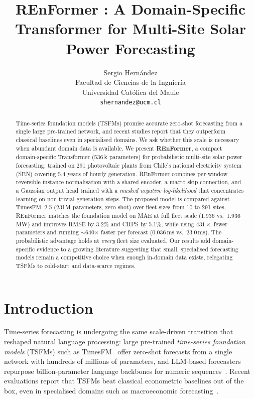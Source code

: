\documentclass[10pt,twocolumn]{article}
\title{\textbf{REnFormer} : A Domain-Specific
Transformer for Multi-Site Solar Power Forecasting}
\author{
  Sergio Hernández\\
  Facultad de Ciencias de la Ingniería\\
  Universidad Católica del Maule\\
  \texttt{shernandez@ucm.cl}
}
\date{}
\begin{document}
\maketitle

\begin{abstract}
Time-series foundation models (TSFMs) promise accurate
zero-shot forecasting from a single large pre-trained network, and recent
studies report that they outperform classical baselines even in
specialised domains. We ask whether this scale is necessary when abundant
domain data is available. We present \textbf{REnFormer}, a compact
domain-specific Transformer (536\,k parameters) for probabilistic
multi-site solar power forecasting, trained on 291 photovoltaic plants
from Chile's national electricity system (SEN) covering 5.4 years of
hourly generation. REnFormer combines per-window reversible instance
normalisation with a shared encoder, a macro skip connection, and a Gaussian output head trained with
a \emph{masked negative log-likelihood} that concentrates learning on
non-trivial generation steps. The proposed model is compared against
TimesFM~2.5 (231M parameters, zero-shot) over fleet sizes from 10 to 291
sites, REnFormer matches the foundation model on MAE at full fleet scale
(1.936 vs.\ 1.936\,MW) and improves RMSE by 3.2\% and CRPS by 5.1\%,
while using $431\times$ fewer parameters and running $\sim$640$\times$
faster per forecast (0.036\,ms vs.\ 23.0\,ms). The probabilistic advantage
holds at \emph{every} fleet size evaluated. Our results add domain-specific
evidence to a growing literature suggesting that small, specialised
forecasting models remain a competitive choice when enough in-domain data
exists, relegating TSFMs to cold-start and data-scarce regimes.
\end{abstract}

\section{Introduction}

Time-series forecasting is undergoing the same scale-driven transition
that reshaped natural language processing: large pre-trained
\emph{time-series foundation models} (TSFMs) such as
TimesFM~\cite{das2024timesfm} offer zero-shot forecasts from a single
network with hundreds of millions of parameters, and LLM-based
forecasters repurpose billion-parameter language backbones for numeric
sequences~\cite{zhang2024survey,liu2024autotimes,niu2025langtime}.
Recent evaluations report that TSFMs beat classical econometric
baselines out of the box, even in specialised domains such as
macroeconomic forecasting~\cite{katharakis2025slm}.
\end{document}
